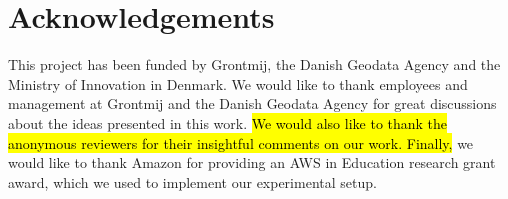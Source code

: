 \section{Acknowledgements}
This project has been funded by Grontmij, the Danish Geodata Agency and the Ministry of Innovation in Denmark. We would like to thank employees and management at Grontmij and the Danish Geodata Agency for great discussions about the ideas presented in this work. \hl{We would also like to thank the anonymous reviewers for their insightful comments on our work. Finally,} we would like to thank Amazon for providing an AWS in Education research grant award, which we used to implement our experimental setup.  